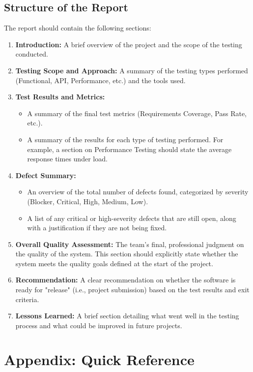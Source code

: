 \documentclass{article}
\begin{document}
\subsection{Structure of the Report}
The report should contain the following sections:
\begin{enumerate}
    \item \textbf{Introduction:} A brief overview of the project and the scope of the testing conducted.
    \item \textbf{Testing Scope and Approach:} A summary of the testing types performed (Functional, API, Performance, etc.) and the tools used.
    \item \textbf{Test Results and Metrics:}
        \begin{itemize}
            \item A summary of the final test metrics (Requirements Coverage, Pass Rate, etc.).
            \item A summary of the results for each type of testing performed. For example, a section on Performance Testing should state the average response times under load.
        \end{itemize}
    \item \textbf{Defect Summary:}
        \begin{itemize}
            \item An overview of the total number of defects found, categorized by severity (Blocker, Critical, High, Medium, Low).
            \item A list of any critical or high-severity defects that are still open, along with a justification if they are not being fixed.
        \end{itemize}
    \item \textbf{Overall Quality Assessment:} The team's final, professional judgment on the quality of the system. This section should explicitly state whether the system meets the quality goals defined at the start of the project.
    \item \textbf{Recommendation:} A clear recommendation on whether the software is ready for "release" (i.e., project submission) based on the test results and exit criteria.
    \item \textbf{Lessons Learned:} A brief section detailing what went well in the testing process and what could be improved in future projects.
\end{enumerate}

\appendix
\section{Appendix: Quick Reference}
\end{document}
